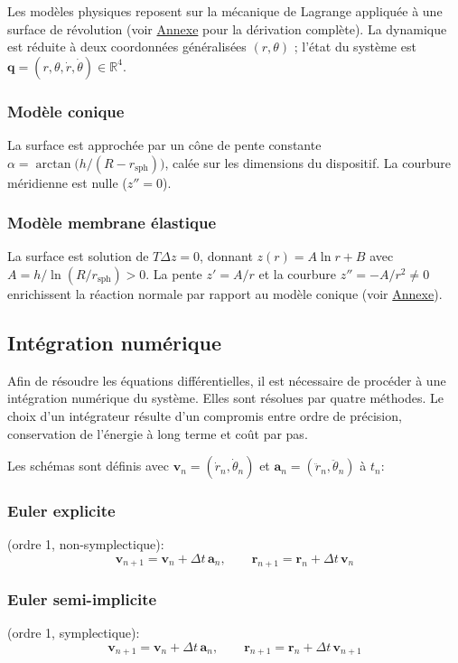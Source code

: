 \documentclass[
	a4paper, %
	10pt, %
	unnumberedsections, %
	twoside, %
]{LTJournalArticle}
\begin{document}
Les modèles physiques reposent sur la mécanique de Lagrange appliquée à une
surface de révolution (voir \hyperref[app:phys]{Annexe} pour la dérivation
complète). La dynamique est réduite à deux coordonnées généralisées
$(r,\theta)$ ; l'état du système est
$\mathbf{q}=(r,\theta,\dot{r},\dot{\theta})\in\mathbb{R}^4$.

\subsubsection{Modèle conique} La surface est approchée par un cône de pente
constante $\alpha = \arctan\bigl(h/(R-r_\text{sph})\bigr)$,
calée sur les dimensions du dispositif. La courbure méridienne est nulle ($z''=0$).

\subsubsection{Modèle membrane élastique} La surface est solution de $T\Delta z=0$,
donnant $z(r)=A\ln r+B$ avec $A=h/\ln(R/r_\text{sph})>0$.
La pente $z'=A/r$ et la courbure $z''=-A/r^2\neq 0$ enrichissent
la réaction normale par rapport au modèle conique
(voir \hyperref[app:membrane-phys]{Annexe}).

\subsection{Intégration numérique}

Afin de résoudre les équations différentielles, il est nécessaire de procéder à une intégration numérique du système.
Elles sont résolues par quatre méthodes. Le choix
d'un intégrateur résulte d'un compromis entre ordre de précision, conservation
de l'énergie à long terme et coût par pas.

Les schémas sont définis avec $\mathbf{v}_n = (\dot{r}_n, \dot{\theta}_n)$
et $\mathbf{a}_n = (\ddot{r}_n, \ddot{\theta}_n)$ à $t_n$:

\subsubsection{Euler explicite} (ordre 1, non-symplectique):
\[
	\mathbf{v}_{n+1} = \mathbf{v}_n + \Delta t\,\mathbf{a}_n, \qquad
	\mathbf{r}_{n+1} = \mathbf{r}_n + \Delta t\,\mathbf{v}_n
\]

\subsubsection{Euler semi-implicite} (ordre 1, symplectique):
\[
	\mathbf{v}_{n+1} = \mathbf{v}_n + \Delta t\,\mathbf{a}_n, \qquad
	\mathbf{r}_{n+1} = \mathbf{r}_n + \Delta t\,\mathbf{v}_{n+1}
\]
\end{document}
